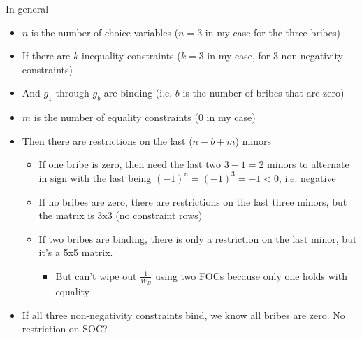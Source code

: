 \documentclass[12pt]{article}
\begin{document}
\vskip1in
In general
\begin{itemize}
	\item $n$ is the number of choice variables ($n=3$ in my case for the three bribes)
	\item If there are $k$ inequality constraints ($k=3$ in my case, for 3 non-negativity constraints)
	\item And $g_1$ through $g_b$ are binding (i.e. $b$ is the number of bribes that are zero)
	\item $m$ is the number of equality constraints (0 in my case)
	\item Then there are restrictions on the last ($n-b+m$) minors
		\begin{itemize}
			\item If one bribe is zero, then need the last two $3-1 =2$ minors to alternate in sign with the last being $(-1)^n = (-1)^3 = -1 <0$, i.e. negative
			\item If no bribes are zero, there are restrictions on the last three minors, but the matrix is 3x3 (no constraint rows)
			\item If two bribes are binding, there is only a restriction on the last minor, but it's a 5x5 matrix.
				\begin{itemize}
					\item But can't wipe out $\frac{1}{W_B}$ using two FOCs because only one holds with equality
				\end{itemize}
		\end{itemize}
	\item If all three non-negativity constraints bind, we know all bribes are zero. No restriction on SOC?
\end{itemize}

\newpage
\end{document}
